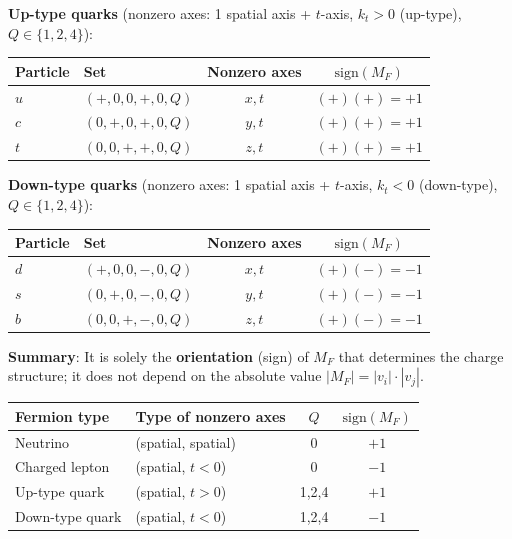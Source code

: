 \documentclass[
  a4paper,11pt]{article}
\newcounter{none} %
\begin{document}
\textbf{Up-type quarks} (nonzero axes: 1 spatial axis + \(t\)-axis,
\(k_t > 0\) (up-type), \(Q \in \{1, 2, 4\}\)):

{\def\LTcaptype{none} %
\begin{longtable}[]{@{}llcc@{}}
\toprule\noalign{}
Particle & Set & Nonzero axes & \(\text{sign}(M_F)\) \\
\midrule\noalign{}
\endhead
\bottomrule\noalign{}
\endlastfoot
\(u\) & \((+, 0, 0, +, 0, Q)\) & \(x, t\) & \((+)(+)= +1\) \\
\(c\) & \((0, +, 0, +, 0, Q)\) & \(y, t\) & \((+)(+)= +1\) \\
\(t\) & \((0, 0, +, +, 0, Q)\) & \(z, t\) & \((+)(+)= +1\) \\
\end{longtable}
}

\textbf{Down-type quarks} (nonzero axes: 1 spatial axis + \(t\)-axis,
\(k_t < 0\) (down-type), \(Q \in \{1, 2, 4\}\)):

{\def\LTcaptype{none} %
\begin{longtable}[]{@{}llcc@{}}
\toprule\noalign{}
Particle & Set & Nonzero axes & \(\text{sign}(M_F)\) \\
\midrule\noalign{}
\endhead
\bottomrule\noalign{}
\endlastfoot
\(d\) & \((+, 0, 0, -, 0, Q)\) & \(x, t\) & \((+)(-)= -1\) \\
\(s\) & \((0, +, 0, -, 0, Q)\) & \(y, t\) & \((+)(-)= -1\) \\
\(b\) & \((0, 0, +, -, 0, Q)\) & \(z, t\) & \((+)(-)= -1\) \\
\end{longtable}
}

\textbf{Summary}: It is solely the \textbf{orientation} (sign) of
\(M_F\) that determines the charge structure; it does not depend on the
absolute value \(|M_F| = |v_i| \cdot |v_j|\).

{\def\LTcaptype{none} %
\begin{longtable}[]{@{}llcc@{}}
\toprule\noalign{}
Fermion type & Type of nonzero axes & \(Q\) & \(\text{sign}(M_F)\) \\
\midrule\noalign{}
\endhead
\bottomrule\noalign{}
\endlastfoot
Neutrino & (spatial, spatial) & 0 & \(+1\) \\
Charged lepton & (spatial, \(t<0\)) & 0 & \(-1\) \\
Up-type quark & (spatial, \(t>0\)) & 1,2,4 & \(+1\) \\
Down-type quark & (spatial, \(t<0\)) & 1,2,4 & \(-1\) \\
\end{longtable}
}
\end{document}
